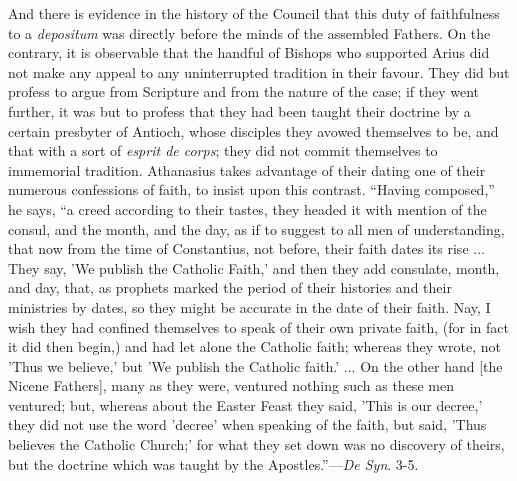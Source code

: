 And there is evidence in the history of the
Council that this duty of faithfulness to a \emph{depositum} was
directly before the minds of the assembled Fathers. On the contrary,
it is observable that the handful of Bishops who supported Arius did
not make any appeal to any uninterrupted tradition in their favour.
They did but profess to argue from Scripture and from the nature of
the case; if they went further, it was but to profess that they had
been taught their doctrine by a certain presbyter of Antioch, whose
disciples they avowed themselves to be, and that with a sort of \emph{esprit
de corps}; they did not commit themselves to immemorial tradition.
Athanasius takes advantage of their dating one of their numerous
confessions of faith, to insist upon this contrast. ``Having composed,''
he says, ``a creed according to their tastes, they headed it with
mention of the consul, and the month, and the day, as if to suggest to
all men of understanding, that now from the time of Constantius, not
before, their faith dates its rise ... They say, 'We publish the
Catholic Faith,' and then they add consulate, month, and day, that, as
prophets marked the period of their histories and their ministries by
dates, so they might be accurate in the date of their faith. Nay, I
wish they had confined themselves to speak of their own private faith,
(for in fact it did then begin,) and had let alone the Catholic
faith; whereas they wrote, not 'Thus we believe,' but 'We publish the
Catholic faith.' ... On the other hand [the Nicene Fathers], many as
they were, ventured nothing such as these men ventured; but, whereas
about the Easter Feast they said, 'This is our decree,' they did not
use the word 'decree' when speaking of the faith, but said, 'Thus
believes the Catholic Church;' for what they set down was no discovery
of theirs, but the doctrine which was taught by the Apostles.''—\emph{De
Syn}. 3-5.

